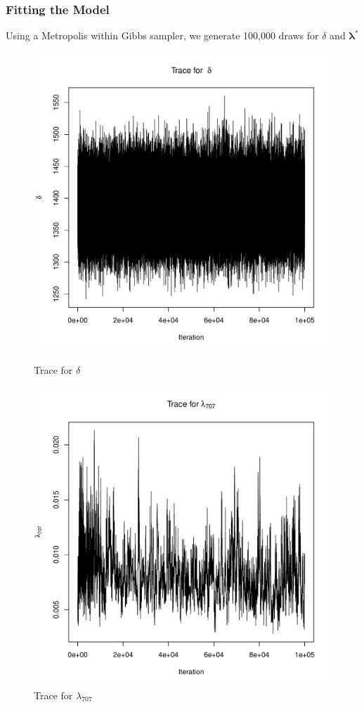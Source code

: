 \documentclass[10pt, compress]{beamer}
\begin{document}
  \begin{frame}
    \frametitle{Fitting the Model}
    Using a Metropolis within Gibbs sampler, we generate 100,000 draws for $\delta$ and $\boldsymbol\lambda^{*}$
    \begin{figure}
      \begin{minipage}{0.45\textwidth}
        \includegraphics[width=1.0\textwidth]{delta_trace.pdf}
        \caption{Trace for $\delta$}
      \end{minipage}
      \hfill
      \begin{minipage}{0.455555\textwidth}
        \includegraphics[width=1.0\textwidth]{lambda_trace.pdf}
        \caption{Trace for $\lambda_{707}$}
      \end{minipage}
    \end{figure}
  \end{frame}
\end{document}
